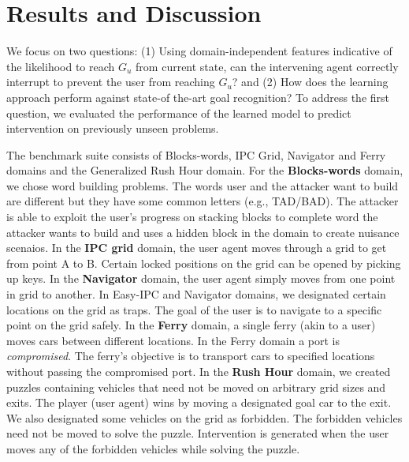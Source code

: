 \documentclass[letterpaper]{article}
\theoremstyle{plain}
\begin{document}
\section{Results and Discussion}
We focus on two questions: (1) Using domain-independent features indicative of the likelihood to reach $G_u$ from current state, can the intervening agent correctly interrupt to prevent the user from reaching $G_u$? and (2) How does the learning approach perform against state-of the-art goal recognition? To address the first question, we evaluated the performance of the learned model to predict intervention on previously unseen problems.

The benchmark suite consists of Blocks-words, IPC Grid, Navigator and Ferry domains and the Generalized Rush Hour domain. For the \textbf{Blocks-words} domain, we chose word building problems. The words user and the attacker want to build are different but they have some common letters (e.g., TAD/BAD). The attacker is able to exploit the user's progress on stacking blocks to complete word the attacker wants to build and uses a hidden block in the domain to create nuisance scenaios. In the \textbf{IPC grid} domain, the user agent moves through a grid to get from point A to B. Certain locked positions on the grid can be opened by picking up keys. In the \textbf{Navigator} domain, the user agent simply moves from one point in grid to another. In Easy-IPC and Navigator domains, we designated certain locations on the grid as traps. The goal of the user is to navigate to a specific point on the grid safely. In the \textbf{Ferry} domain, a single ferry (akin to a user) moves cars between different locations. In the Ferry domain a port is \emph{compromised}. The ferry's objective is to transport cars to specified locations without passing the compromised port. In the \textbf{Rush Hour} domain, we created puzzles containing vehicles that need not be moved on arbitrary grid sizes and exits. The player (user agent) wins by moving a designated goal car to the exit. We also designated some vehicles on the grid as forbidden. The forbidden vehicles need not be moved to solve the puzzle. Intervention is generated when the user moves any of the forbidden vehicles while solving the puzzle.
\end{document}
